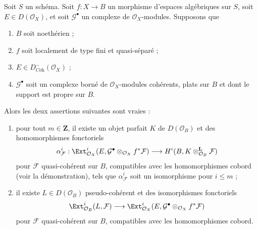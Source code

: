 \begin{lemma}
\label{lemma-compute-ext}
Soit $S$ un sch\'ema. Soit $f:X\to B$ un morphisme d'espaces alg\'ebriques sur
$S$, soit $E\in D(\mathcal{O}_X)$, et soit $\mathcal{G}^\bullet$ un complexe de
$\mathcal{O}_X$-modules. Supposons que
\begin{enumerate}
\item $B$ soit noeth\'erien ;
\item $f$ soit localement de type fini et quasi-s\'epar\'e ;
\item $E\in D^-_{\textit{Coh}}(\mathcal{O}_X)$ ;
\item $\mathcal{G}^\bullet$ soit un complexe born\'e de
$\mathcal{O}_X$-modules coh\'erents, plats sur $B$ et dont le support est propre
sur $B$.
\end{enumerate}
Alors les deux assertions suivantes sont vraies :
\begin{enumerate}
\item[(A)] pour tout $m\in\mathbf{Z}$, il existe un objet parfait $K$ de
$D(\mathcal{O}_B)$ et des homomorphismes fonctoriels
$$
\alpha^i_\mathcal{F} :
\Ext^i_{\mathcal{O}_X}(E,
\mathcal{G}^\bullet \otimes_{\mathcal{O}_X} f^*\mathcal{F})
\longrightarrow
H^i(B, K \otimes^\mathbf{L}_{\mathcal{O}_B} \mathcal{F})
$$
pour $\mathcal{F}$ quasi-coh\'erent sur $B$, compatibles avec les homomorphismes
cobord (voir la d\'emonstration), tels que $\alpha^i_\mathcal{F}$ soit un
isomorphisme pour $i\leq m$ ;
\item[(B)] il existe $L\in D(\mathcal{O}_B)$ pseudo-coh\'erent et des
isomorphismes fonctoriels
$$
\Ext^i_{\mathcal{O}_B}(L, \mathcal{F}) \longrightarrow
\Ext^i_{\mathcal{O}_X}(E,
\mathcal{G}^\bullet \otimes_{\mathcal{O}_X} f^*\mathcal{F})
$$
pour $\mathcal{F}$ quasi-coh\'erent sur $B$, compatibles avec les homomorphismes
cobord.
\end{enumerate}
\end{lemma}

